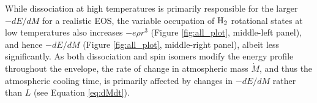 \documentclass[apj]{emulateapj}
\newcommand{\delad}{\nabla_{\rm ad}}
\newcommand{\co}{_{\rm c}}
\begin{document}

While dissociation at high temperatures is primarily responsible for the larger $-dE/dM$ for a realistic EOS, the variable occupation of $\rm H_2$ rotational states at low temperatures also increases $-e \rho r^3$ (Figure \ref{fig:all_plot}, middle-left panel), and hence $-dE/dM$ (Figure \ref{fig:all_plot}, middle-right panel), albeit less significantly. As both dissociation and spin isomers modify the energy profile throughout the envelope, the rate of change in atmospheric mass $\dot{M}$, and thus the atmospheric cooling time, is primarily affected by changes in $-dE/dM$ rather than $L$ (see Equation \ref{eq:dMdt}). 






\end{document}
